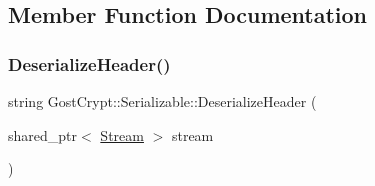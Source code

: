 \subsection{Member Function Documentation}
\mbox{\label{class_gost_crypt_1_1_serializable_a7f36a9d2ec09e05dee375b802fa13ab1}} 
\subsubsection{\texorpdfstring{Deserialize\+Header()}{DeserializeHeader()}}
{\footnotesize\ttfamily string Gost\+Crypt\+::\+Serializable\+::\+Deserialize\+Header (\begin{DoxyParamCaption}\item[{shared\+\_\+ptr$<$ \hyperlink{class_gost_crypt_1_1_stream}{Stream} $>$}]{stream }\end{DoxyParamCaption})\hspace{0.3cm}{\ttfamily [static]}}


